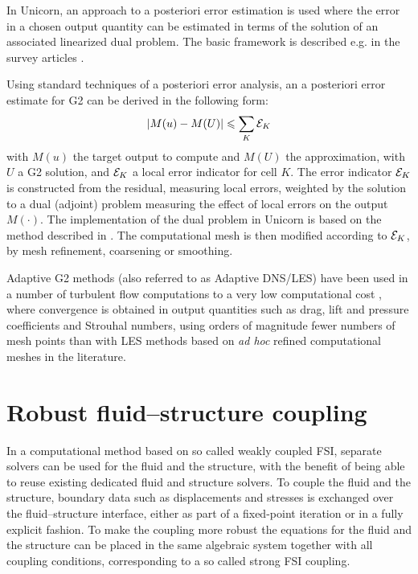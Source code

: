 In Unicorn, an approach to a posteriori error estimation is used
where the error in a chosen output quantity can be estimated in
terms of the solution of an associated linearized dual problem. The
basic framework is described e.g. in the survey articles
\citep{ErikssonEstepEtAl1995,BeckerRannacher2001,GilesSuli2002}.

Using standard techniques of a posteriori error analysis, an a posteriori
error estimate for G2 can be derived in the following form:
\begin{equation}
\vert M(u) - M(U) \vert \leqslant \sum_K {\cal E}_K
\end{equation}
with $M(u)$ the target output to compute and $M(U)$ the approximation,
with $U$ a G2 solution, and ${\cal E}_K$ a local error indicator for
cell $K$.  The error indicator ${\cal E}_K$ is constructed from the
residual, measuring local errors, weighted by the solution to a dual
(adjoint) problem measuring the effect of local errors on the output
$M(\cdot)$. The implementation of the dual problem in Unicorn is based on
the \cgone{}\cgone{} method described in \citet{HoffmanJohnson2007}. The
computational mesh is then modified according to $ {\cal E}_K$, by mesh
refinement, coarsening or smoothing.

Adaptive G2 methods (also referred to as
Adaptive DNS/LES) have been used in a number of
turbulent flow computations to a very low computational cost
\citep{Hoffman2005,HoffmanJohnson2006b,Hoffman2006,Hoffman2009,HoffmanJansson2009,VilelaJanssonEtAl2010},
where convergence is obtained in output quantities such as drag, lift
and pressure coefficients and Strouhal numbers, using orders of magnitude
fewer numbers of mesh points than with LES methods based on \emph{ad hoc}
refined computational meshes in the literature.

\section{Robust fluid--structure coupling}

In a computational method based on so called weakly coupled FSI, separate
solvers can be used for the fluid and the structure, with the benefit of
being able to reuse existing dedicated fluid and structure solvers. To
couple the fluid and the structure, boundary data such as displacements
and stresses is exchanged over the fluid--structure interface, either as
part of a fixed-point iteration or in a fully explicit fashion. To make
the coupling more robust the equations for the fluid and the structure
can be placed in the same algebraic system together with all coupling
conditions, corresponding to a so called strong FSI coupling.

